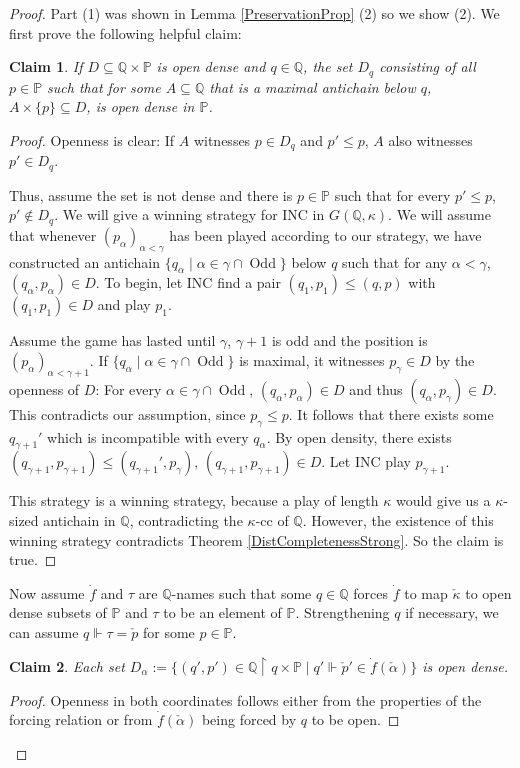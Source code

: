 \documentclass[12pt]{amsart}
\theoremstyle{definition}
\theoremstyle{remark}
\theoremstyle{plain}
\newtheorem{myclaim}{Claim}
\numberwithin{mydef}{section}
\DeclareMathOperator{\Odd}{Odd}
\newcommand{\dP}{\mathbb{P}}
\newcommand{\dQ}{\mathbb{Q}}
\newcommand{\uhr}{\upharpoonright}
\begin{document}
	\begin{proof}
		Part (1) was shown in Lemma \ref{PreservationProp} (2) so we show (2).
		\setcounter{myclaim}{0}
		We first prove the following helpful claim:
		\begin{myclaim}
			If $D\subseteq\dQ\times\dP$ is open dense and $q\in\dQ$, the set $D_q$ consisting of all $p\in\dP$ such that for some $A\subseteq\dQ$ that is a maximal antichain below $q$, $A\times\{p\}\subseteq D$, is open dense in $\dP$.
		\end{myclaim}
		\begin{proof}
			Openness is clear: If $A$ witnesses $p\in D_q$ and $p'\leq p$, $A$ also witnesses $p'\in D_q$.
			
			Thus, assume the set is not dense and there is $p\in\dP$ such that for every $p'\leq p$, $p'\notin D_q$. We will give a winning strategy for INC in $G(\dQ,\kappa)$. We will assume that whenever $(p_{\alpha})_{\alpha<\gamma}$ has been played according to our strategy, we have constructed an antichain $\{q_{\alpha}\;|\;\alpha\in\gamma\cap\Odd\}$ below $q$ such that for any $\alpha<\gamma$, $(q_{\alpha},p_{\alpha})\in D$. To begin, let INC find a pair $(q_1,p_1)\leq(q,p)$ with $(q_1,p_1)\in D$ and play $p_1$.
				
			Assume the game has lasted until $\gamma$, $\gamma+1$ is odd and the position is $(p_{\alpha})_{\alpha<\gamma+1}$. If $\{q_{\alpha}\;|\;\alpha\in\gamma\cap\Odd\}$ is maximal, it witnesses $p_{\gamma}\in D$ by the openness of $D$: For every $\alpha\in\gamma\cap\Odd$, $(q_{\alpha},p_{\alpha})\in D$ and thus $(q_{\alpha},p_{\gamma})\in D$. This contradicts our assumption, since $p_{\gamma}\leq p$. It follows that there exists some $q_{\gamma+1}'$ which is incompatible with every $q_{\alpha}$. By open density, there exists $(q_{\gamma+1},p_{\gamma+1})\leq(q_{\gamma+1}',p_{\gamma})$, $(q_{\gamma+1},p_{\gamma+1})\in D$. Let INC play $p_{\gamma+1}$.
			
			This strategy is a winning strategy, because a play of length $\kappa$ would give us a $\kappa$-sized antichain in $\dQ$, contradicting the $\kappa$-cc of $\dQ$. However, the existence of this winning strategy contradicts Theorem \ref{DistCompletenessStrong}. So the claim is true.
		\end{proof}
		Now assume $\dot{f}$ and $\tau$ are $\dQ$-names such that some $q\in\dQ$ forces $\dot{f}$ to map $\check{\kappa}$ to open dense subsets of $\dP$ and $\tau$ to be an element of $\dP$. Strengthening $q$ if necessary, we can assume $q\Vdash\tau=\check{p}$ for some $p\in\dP$.
		\begin{myclaim}
			Each set $D_{\alpha}:=\{(q',p')\in\dQ\uhr q\times\dP\;|\;q'\Vdash\check{p}'\in\dot{f}(\check{\alpha})\}$ is open dense.
		\end{myclaim}
		\begin{proof}
			Openness in both coordinates follows either from the properties of the forcing relation or from $\dot{f}(\check{\alpha})$ being forced by $q$ to be open.
				

\end{proof}
\end{proof}
\end{document}
